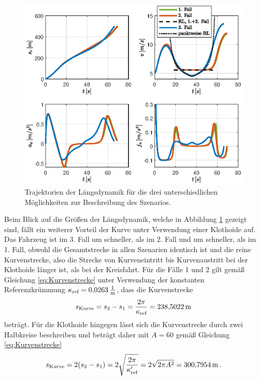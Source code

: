 \begin{figure}[h] 
	\centering
	\includegraphics[width=\linewidth]{./Bilder/Ergebnisse/Gerade_Kurve_Gerade/svaj.eps}
	\caption{Trajektorien der Längsdynamik für die drei unterschiedlichen Möglichkeiten zur Beschreibung des Szenarios.}
	\label{fig:gerade_kurve_gerade_svaj}
\end{figure}  
Beim Blick auf die Größen der Längsdynamik, welche in Abbildung \ref{fig:gerade_kurve_gerade_svaj} gezeigt sind, fällt ein weiterer Vorteil der Kurve unter Verwendung einer Klothoide auf. Das Fahrzeug ist im 3. Fall um  schneller, als im 2. Fall und um  schneller, als im 1. Fall, obwohl die Gesamtstrecke in allen Szenarien identisch ist und die reine Kurvenstrecke, also die Strecke von Kurveneintritt bis Kurvenaustritt bei der Klothoide länger ist, als bei der Kreisfahrt. Für die Fälle 1 und 2 gilt gemäß Gleichung \eqref{eq:Kurvenstrecke} unter Verwendung der konstanten Referenzkrümmung $\kappa_{\textrm{ref}} = 0{,}0263\,\mathrm{\frac{\mathrm{1}}{\mathrm{m}}}$, dass die Kurvenstrecke 
\begin{equation}
	s_\textrm{Kurve} = s_2 - s_1 = \frac{2\pi}{\kappa_{\textrm{ref}}} = 238{,}5022\,\mathrm{m}
\end{equation}
beträgt. Für die Klothoide hingegen lässt sich die Kurvenstrecke durch zwei Halbkreise beschreiben und beträgt daher mit $A = 60$ gemäß Gleichung \eqref{eq:Kurvenstrecke}
\begin{equation}
s_\textrm{Kurve} = 2(s_2 - s_1) = 2\sqrt{\frac{2\pi}{\kappa'_{\textrm{ref}}}} = 2\sqrt{2\pi A^2} = 300{,}7954\,\mathrm{m}\,.
\end{equation}
